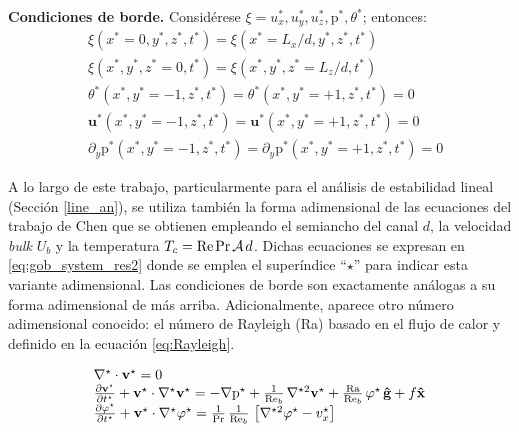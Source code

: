 \textbf{Condiciones de borde.} Considérese $\xi= u^*_x, u^*_y, u^*_z, \text{p}^*, \theta^*$; entonces:
\begin{align}
&\xi(x^*=0,y^*,z^*,t^*) = \xi(x^*=L_x/d,y^*,z^*,t^*) 
	\label{eq:bc_1} \\
&\xi(x^*,y^*,z^*=0,t^*) = \xi(x^*,y^*,z^*=L_z/d,t^*) 
	\label{eq:bc_2} \\
&\theta^*(x^*,y^*=-1,z^*,t^*)       = \theta^*(x^*,y^*=+1,z^*,t^*) = 0
	\label{eq:bc_3} \\
&\mathbf{u^*}(x^*,y^*=-1,z^*,t^*)   = \mathbf{u^*}(x^*,y^*=+1,z^*,t^*) = 0
	\label{eq:bc_4} \\
&\partial_y \text{p}^*(x^*,y^*=-1,z^*,t^*) = \partial_y \text{p}^*(x^*,y^*=+1,z^*,t^*) = 0
	\label{eq:bc_5}
\end{align}

A lo largo de este trabajo, particularmente para el análisis de estabilidad lineal (Sección \ref{line_an}), se utiliza también la forma adimensional de las ecuaciones del trabajo de Chen \cite{chen1996linear} que se obtienen empleando el  semiancho del canal $d$, la velocidad \textit{bulk} $U_b$ y la temperatura $T_c = \text{Re} \hspace{0.5mm} \text{Pr} \hspace{0.5mm} \mathcal{A} \hspace{0.5mm} d$. Dichas ecuaciones se expresan en \ref{eq:gob_system_res2} donde se emplea el superíndice ``${\star}$'' para indicar esta variante adimensional. Las condiciones de borde son exactamente análogas a su forma adimensional de más arriba. Adicionalmente, aparece otro número adimensional conocido: el número de Rayleigh (Ra) basado en el flujo de calor y definido en la ecuación \ref{eq:Rayleigh}.

\begin{equation}
\begin{array}{l}
    \nabla^{\star} \cdot \mathbf{v^{\star}} = 0 \\
    \frac{\partial \mathbf{v^{\star}}}{\partial t^{\star}} + \mathbf{v^{\star}} \cdot \nabla^{\star} \mathbf{v^{\star}} = 
    -\nabla \text{p}^{\star} + \frac{1}{\text{Re}_b} \hspace{0.5mm} \nabla^{{\star}2} \mathbf{v^{\star}} + \frac{\text{Ra}}{\text{Re}_b} \hspace{0.5mm} \varphi^{\star} \hspace{0.5mm} \mathbf{\hat{g}} + f \mathbf{\hat{x}} \\
    \frac{\partial \varphi^{\star}}{\partial t^{\star}} + \mathbf{v^{\star}} \cdot \nabla^{\star} \varphi^{\star} = 
    \frac{1}{\text{Pr}}\hspace{0.5mm}  \frac{1}{\text{Re}_b} \hspace{0.5mm} \left[ \nabla^{{\star}2} \varphi^{\star} - v_x^{\star} \right]  
\end{array}
\label{eq:gob_system_res2}
\end{equation}

